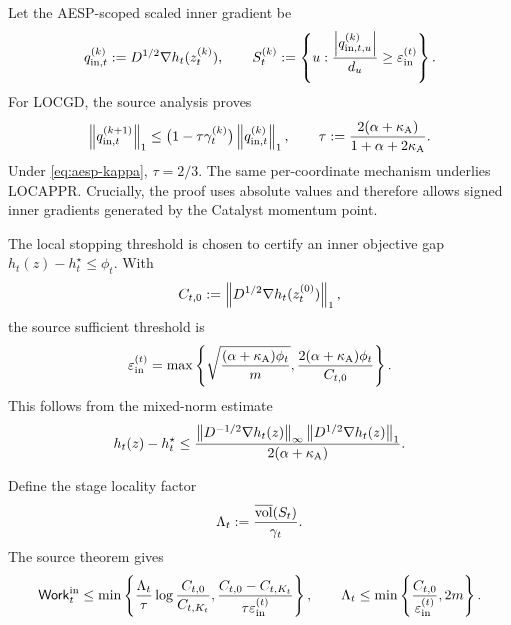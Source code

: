 Let the AESP-scoped scaled inner gradient be
\begin{equation}
    q_{\mathrm{in},t}^{(k)}:=D^{1/2}\nabla h_t(z_t^{(k)}),
    \qquad
    S_t^{(k)}
    :=\left\{u:\frac{\left\lvert q_{\mathrm{in},t,u}^{(k)}\right\rvert}{d_u}
                    \geq\varepsilon_{\mathrm{in}}^{(t)}\right\}.
    \label{eq:aesp-inner-active}
\end{equation}
For LOCGD, the source analysis proves
\begin{equation}
    \left\lVert q_{\mathrm{in},t}^{(k+1)}\right\rVert_1
    \leq
    \bigl(1-\tau\gamma_t^{(k)}\bigr)
    \left\lVert q_{\mathrm{in},t}^{(k)}\right\rVert_1,
    \qquad
    \tau
    :=\frac{2(\alpha+\kappa_{\mathrm A})}{1+\alpha+2\kappa_{\mathrm A}}.
    \label{eq:aesp-inner-contraction}
\end{equation}
Under \cref{eq:aesp-kappa}, \(\tau=2/3\).  The same per-coordinate mechanism
underlies LOCAPPR.  Crucially, the proof uses absolute values and therefore
allows signed inner gradients generated by the Catalyst momentum point.

The local stopping threshold is chosen to certify an inner objective gap
\(h_t(z)-h_t^\star\leq\phi_t\).  With
\begin{equation}
    C_{t,0}:=\left\lVert D^{1/2}\nabla h_t(z_t^{(0)})\right\rVert_1,
    \label{eq:inner-initial-mass}
\end{equation}
the source sufficient threshold is
\begin{equation}
    \varepsilon_{\mathrm{in}}^{(t)}
    =\max\left\{
        \sqrt{\frac{(\alpha+\kappa_{\mathrm A})\phi_t}{m}},
        \frac{2(\alpha+\kappa_{\mathrm A})\phi_t}{C_{t,0}}
    \right\}.
    \label{eq:aesp-inner-tolerance}
\end{equation}
This follows from the mixed-norm estimate
\begin{equation}
    h_t(z)-h_t^\star
    \leq
    \frac{
       \left\lVert D^{-1/2}\nabla h_t(z)\right\rVert_\infty
       \left\lVert D^{1/2}\nabla h_t(z)\right\rVert_1
    }{2(\alpha+\kappa_{\mathrm A})}.
    \label{eq:mixed-norm-certificate}
\end{equation}

Define the stage locality factor
\begin{equation}
    \Lambda_t
    :=\frac{\overline{\operatorname{vol}}(S_t)}{\gamma_t}.
    \label{eq:lambda-stage}
\end{equation}
The source theorem gives
\begin{equation}
    \mathsf{Work}_t^{\rm in}
    \leq
    \min\left\{
        \frac{\Lambda_t}{\tau}
        \log\frac{C_{t,0}}{C_{t,K_t}},
        \frac{C_{t,0}-C_{t,K_t}}{\tau\varepsilon_{\mathrm{in}}^{(t)}}
    \right\},
    \qquad
    \Lambda_t
    \leq\min\left\{\frac{C_{t,0}}{\varepsilon_{\mathrm{in}}^{(t)}},2m\right\}.
    \label{eq:aesp-stage-work}
\end{equation}

